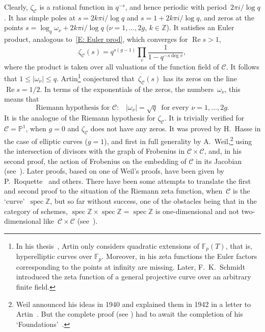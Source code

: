 \documentclass{amsart}
\renewcommand\Re{\operatorname*{Re}}	\renewcommand\Im{\operatorname*{Im}}
\newcommand\Z{\mathbb{Z}}	\newcommand\C{\mathbb{C}}
\newcommand\spec{\operatorname{spec}}
\renewcommand\P{\mathbb{P}}
\newcommand\F{\mathbb{F}}
\newcommand\Curve{\mathcal{C}}
\theoremstyle{definition}\newtheorem{definition}[theorem]{Definition}
\theoremstyle{remark}\newtheorem{remark}[theorem]{Remark}
\numberwithin{equation}{section}
\begin{document}
Clearly,
$\zeta_\Curve$ is a rational function in $q^{-s}$,
and hence periodic with period~$2\pi i/\log q$.
It has simple poles at $s=2k\pi i/\log q$ and $s=1+2k\pi i/\log q$,
and zeros at the points $s=\log_q\omega_\nu+2k\pi i/\log q$ ($\nu=1,\dots,2g$,
$k\in\Z$).
It satisfies an Euler product,
analogous to~\eqref{E: Euler prod},
which converges for $\Re s>1$,
$$
\zeta_\Curve(s)=q^{s(g-1)}\prod_v\frac1{1-q^{-s\deg v}},
$$
where the product is taken over all valuations of the function field of $\Curve$.
It follows that $1\leq|\omega_\nu|\leq q$.
Artin\footnote{In his thesis~\cite{ArtinThesis},
Artin only considers quadratic extensions of $\F_p(T)$,
that is,
hyperelliptic curves over $\F_p$.
Moreover,
in his zeta functions the Euler factors corresponding to the points at infinity are missing.
Later,
F.\ K.~Schmidt~\cite{fSchmidt} introduced the zeta function of a general projective curve over an arbitrary finite field.}
conjectured that~$\zeta_\Curve(s)$ has its zeros on the line $\Re s=1/2$.
In terms of the exponentials of the zeros,
the numbers~$\omega_\nu$,
this means that
$$
\text{Riemann hypothesis for $\Curve$:}\quad|\omega_\nu|=\sqrt q\ \text{ for every }\nu=1,\dots,2g.
$$
It is the analogue of the Riemann hypothesis for $\zeta_\Curve$.
It is trivially verified for $\Curve=\P^1$,
when $g=0$ and $\zeta_\Curve$ does not have any zeros.
It was proved by H.~Hasse in the case of elliptic curves ($g=1$),
and first in full generality by A.~Weil,\footnote
{Weil announced his ideas in 1940 \cite{aW40,aW41} and explained them in 1942 in a letter to Artin~\cite{letter}.
But the complete proof (see \cite{aW49,aW71}) had to await the completion of his `Foundations'~\cite{Foundations}.}
 using the intersection of divisors with the graph of Frobenius in $\Curve\times\Curve$,
and,
in his second proof,
 the action of Frobenius on the embedding of $\Curve$ in its Jacobian (see~\cite[Appendix]{Rosen}).
Later proofs,
based on one of Weil's proofs,
have been given by P.~Roquette~\cite{Roquette} and others.
There have been some attempts to translate the first and second proof to the situation of the Riemann zeta function,
when~$\Curve$ is the `curve'~$\spec\Z$,
but so far without success,
one of the obstacles being that in the category of schemes,
$\spec\Z\times\spec\Z=\spec\Z$ is one-dimensional and not two-dimensional like~$\Curve\times\Curve$ (see~\cite{indextheory}).
\end{document}
